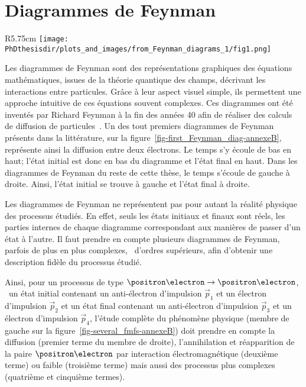 \chapter{Diagrammes de Feynman}\label{annexe-fmf}
\begin{wrapfigure}{R}{5.75cm}
\centering
\texttt{[image: \\PhDthesisdir/plots\_and\_images/from\_Feynman\_diagrams\_1/fig1.png]}
\caption[Diagramme de Feynman de la diffusion électron-électron.]{Diagramme de Feynman de la diffusion électron-électron présenté dans la référence~\cite{Feynman_diagrams_1}.}
\label{fig-first_Feynman_diag-annexeB}
\end{wrapfigure}
Les diagrammes de Feynman sont des représentations graphiques des équations mathématiques, issues de la théorie quantique des champs, décrivant les interactions entre particules.
Grâce à leur aspect visuel simple, ils permettent une approche intuitive de ces équations souvent complexes.
Ces diagrammes ont été inventés par Richard Feynman à la fin des années 40 afin de réaliser des calculs de diffusion de particules~\cite{Feynman_diagrams_1}.
Un des tout premiers diagrammes de Feynman présents dans la littérature, sur la figure~\ref{fig-first_Feynman_diag-annexeB}, représente ainsi la diffusion entre deux électrons.
Le temps s'y écoule de bas en haut; l'état initial est donc en bas du diagramme et l'état final en haut.
Dans les diagrammes de Feynman du reste de cette thèse, le temps s'écoule de gauche à droite.
Ainsi, l'état initial se trouve à gauche et l'état final à droite.
\par Les diagrammes de Feynman ne représentent pas pour autant la réalité physique des processus étudiés.
En effet, seuls les états initiaux et finaux sont réels, les parties internes de chaque diagramme correspondant aux manières de passer d'un état à l'autre.
Il faut prendre en compte plusieurs diagrammes de Feynman, parfois de plus en plus complexes, \ie\ d'ordres supérieurs, afin d'obtenir une description fidèle du processus étudié.
\par Ainsi, pour un processus de type $\positron\electron\to\positron\electron$, \ie\
un état initial contenant
un anti-électron d'impulsion $\vec{p}_1$
et
un électron d'impulsion $\vec{p}_2$
et
un état final contenant
un anti-électron d'impulsion $\vec{p}_3$
et
un électron d'impulsion $\vec{p}_4$,
l'étude complète du phénomène physique (membre de gauche sur la figure~\ref{fig-several_fmfs-annexeB}) doit prendre en compte la diffusion (premier terme du membre de droite), l'annihilation et réapparition de la paire $\positron\electron$ par interaction électromagnétique (deuxième terme) ou faible (troisième terme) mais aussi des processus plus complexes (quatrième et cinquième termes).
